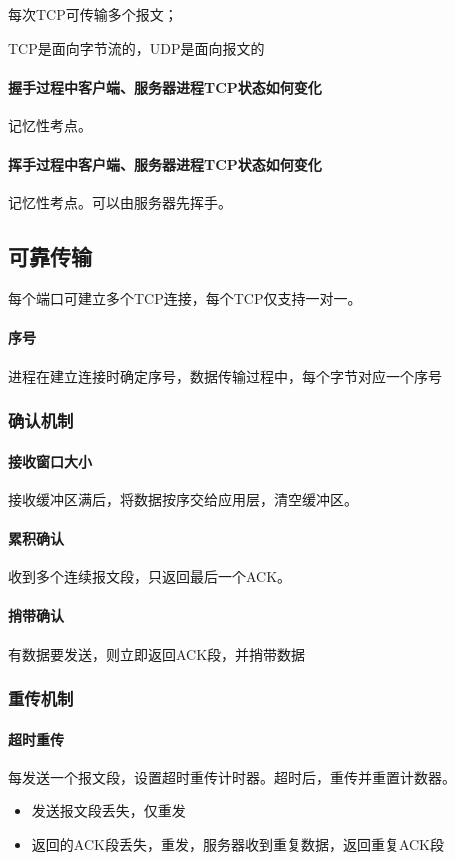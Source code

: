 每次TCP可传输多个报文；

TCP是面向字节流的，UDP是面向报文的

\paragraph{握手过程中客户端、服务器进程TCP状态如何变化}
记忆性考点。

\paragraph{挥手过程中客户端、服务器进程TCP状态如何变化}
记忆性考点。可以由服务器先挥手。


\subsection{可靠传输}
每个端口可建立多个TCP连接，每个TCP仅支持一对一。

\paragraph{序号}
进程在建立连接时确定序号，数据传输过程中，每个字节对应一个序号

\subsubsection{确认机制}

\paragraph{接收窗口大小}
接收缓冲区满后，将数据按序交给应用层，清空缓冲区。

\paragraph{累积确认}
收到多个连续报文段，只返回最后一个ACK。

\paragraph{捎带确认}
有数据要发送，则立即返回ACK段，并捎带数据


\subsubsection{重传机制}

\paragraph{超时重传}
每发送一个报文段，设置超时重传计时器。超时后，重传并重置计数器。
\begin{itemize}
    \item 发送报文段丢失，仅重发
    \item 返回的ACK段丢失，重发，服务器收到重复数据，返回重复ACK段
\end{itemize}

